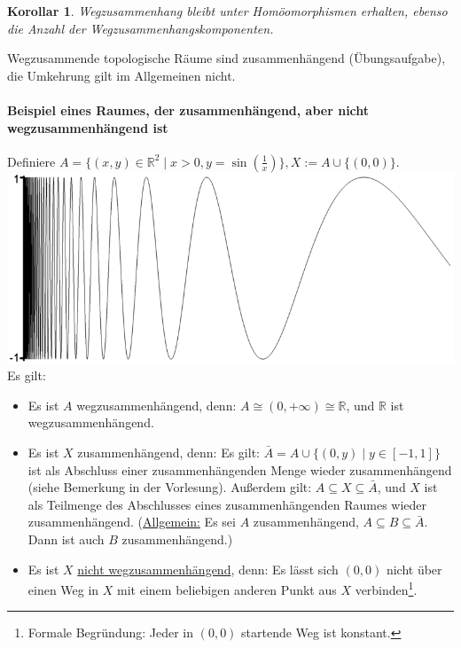 \documentclass[a4paper,11pt,notitlepage]{report}
\newtheorem{corollary}{Korollar}[chapter]
\newcommand{\R}{{\ensuremath{\mathbb{R}}}}
\begin{document}
\begin{corollary}
	Wegzusammenhang bleibt unter Homöomorphismen erhalten, ebenso die Anzahl der Wegzusammenhangskomponenten.
\end{corollary}

Wegzusammende topologische Räume sind zusammenhängend (Übungsaufgabe), die Umkehrung gilt im Allgemeinen nicht.

\paragraph{Beispiel eines Raumes, der zusammenhängend, aber nicht wegzusammenhängend ist}
Definiere $A = \{(x,y) \in \R^2 \mid x > 0, y = \sin{\left(\frac{1}{x}\right)}\}, X := A \cup \{(0,0)\}$.
\newline
\includegraphics[scale=0.4]{images/Sinuseinsdurchx.png}
\newline
Es gilt:
\begin{itemize}
	\item Es ist $A$ wegzusammenhängend, denn:
	 \newline	
	 $A \cong (0, +\infty) \cong \R$, und $\R$ ist wegzusammenhängend.
	\item Es ist $X$ zusammenhängend, denn:
		\newline
		Es gilt: $\bar{A} = A \cup \{(0,y) \mid y \in [-1,1]\}$ ist als Abschluss einer zusammenhängenden Menge wieder zusammenhängend (siehe Bemerkung in der Vorlesung).
		\newline
		Außerdem gilt: $A \subseteq X \subseteq \bar{A}$, und $X$ ist als Teilmenge des Abschlusses eines zusammenhängenden Raumes wieder zusammenhängend. (\underline{Allgemein:} Es sei $A$ zusammenhängend, $A \subseteq B \subseteq \bar{A}$. Dann ist auch $B$ zusammenhängend.)
	\item Es ist $X$ \underline{nicht wegzusammenhängend}, denn:
		\newline
		Es lässt sich $(0,0)$ nicht über einen Weg in $X$ mit einem beliebigen anderen Punkt aus $X$ verbinden\footnote{Formale Begründung: Jeder in $(0,0)$ startende Weg ist konstant.}.
\end{itemize}
\end{document}
